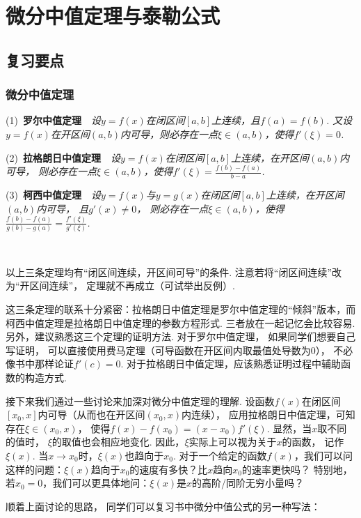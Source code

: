 \clearpage
\section{微分中值定理与泰勒公式}

\subsection{复习要点} \par

\subsubsection{微分中值定理}

(1)~\textbf{罗尔中值定理}~~\textit{设$y=f(x)$在闭区间$[a,b]$上连续，且$f(a)=f(b)$.
又设$y=f(x)$在开区间$(a,b)$内可导，则必存在一点$\xi \in (a,b)$，使得$f'(\xi)=0$.}
\par

(2)~\textbf{拉格朗日中值定理}~~\textit{设$y=f(x)$在闭区间$[a,b]$上连续，在开区间$(a,b)$内可导，
则必存在一点$\xi \in (a,b)$，使得$f'(\xi) = \frac{f(b)-f(a)}{b-a}$.}
\par
(3)~\textbf{柯西中值定理}~~\textit{设$y=f(x)$与$y=g(x)$在闭区间$[a,b]$上连续，在开区间$(a,b)$内可导，
且$g'(x) \ne 0$，
则必存在一点$\xi \in (a,b)$，使得$\frac{f(b)-f(a)}{g(b)-g(a)}=\frac{f'(\xi)}{g'(\xi)}$.}
\par
~\par

以上三条定理均有“闭区间连续，开区间可导”的条件.
注意若将“闭区间连续”改为“开区间连续”，
定理就不再成立（可试举出反例）.

这三条定理的联系十分紧密：拉格朗日中值定理是罗尔中值定理的“倾斜”版本，而柯西中值定理是拉格朗日中值定理的参数方程形式.
三者放在一起记忆会比较容易.
另外，建议熟悉这三个定理的证明方法.
对于罗尔中值定理，
如果同学们想要自己写证明，
可以直接使用费马定理（可导函数在开区间内取最值处导数为$0$），
不必像书中那样论证$f'(c)=0$.
对于拉格朗日中值定理，应该熟悉证明过程中辅助函数的构造方式.\vspace{1em}

接下来我们通过一些讨论来加深对微分中值定理的理解.
设函数$f(x)$在闭区间$[x_{0},x]$内可导（从而也在开区间$(x_0,x)$内连续），
应用拉格朗日中值定理，可知存在$\xi \in (x_0,x)$，
使得$f(x)-f(x_0)=(x-x_0)f'(\xi)$.
显然，当$x$取不同的值时，
$\xi$的取值也会相应地变化.
因此，$\xi$实际上可以视为关于$x$的函数，
记作$\xi(x)$.
当$x \to x_0$时，$\xi(x)$也趋向于$x_0$.
对于一个给定的函数$f(x)$，我们可以问这样的问题：$\xi(x)$趋向于$x_{0}$的速度有多快？比$x$趋向$x_{0}$的速率更快吗？
特别地，若$x_{0}=0$，我们可以更具体地问：$\xi(x)$是$x$的高阶/同阶无穷小量吗？\par
顺着上面讨论的思路，
同学们可以复习书中微分中值公式的另一种写法：\par \vspace{1em}

